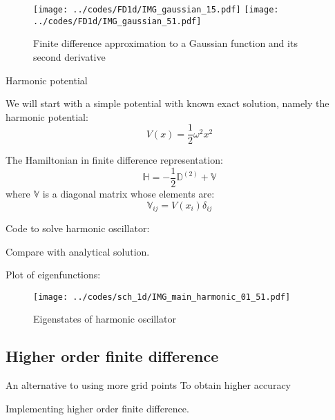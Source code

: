 \begin{figure}[H]
{\center
\texttt{[image: ../codes/FD1d/IMG\_gaussian\_15.pdf]}%
\texttt{[image: ../codes/FD1d/IMG\_gaussian\_51.pdf]}
\par}
\caption{Finite difference approximation to a Gaussian function and its second derivative}
\end{figure}


Harmonic potential

We will start with a simple potential with known exact solution, namely the harmonic potential:
\begin{equation}
V(x) = \frac{1}{2}\omega^2 x^2
\end{equation}

The Hamiltonian in finite difference representation:
\begin{equation}
\mathbb{H} = -\frac{1}{2}\mathbb{D}^{(2)} + \mathbb{V}
\end{equation}
where $\mathbb{V}$ is a diagonal matrix whose elements are:
\begin{equation}
\mathbb{V}_{ij} = V(x_{i})\delta_{ij}
\end{equation}

Code to solve harmonic oscillator:


Compare with analytical solution.

Plot of eigenfunctions:

\begin{figure}[H]
{\center
\texttt{[image: ../codes/sch\_1d/IMG\_main\_harmonic\_01\_51.pdf]}
\par}
\caption{Eigenstates of harmonic oscillator}
\end{figure}


\subsection{Higher order finite difference}

An alternative to using more grid points
To obtain higher accuracy

Implementing higher order finite difference.